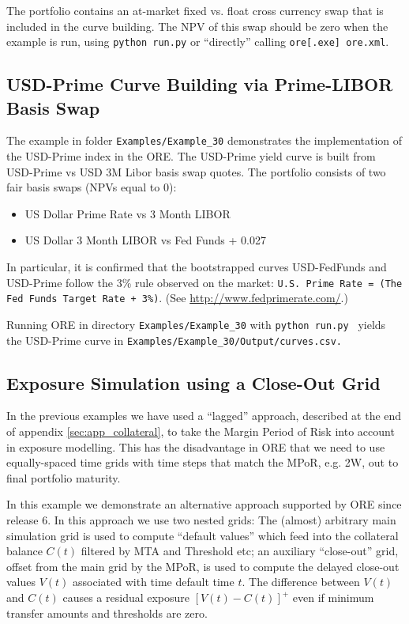 \documentclass[12pt, a4paper]{article}
\begin{document}
The portfolio contains an at-market fixed vs. float cross currency swap that is 
included in the curve building. The NPV of this swap should be zero when the example is run,
using {\tt python run.py} or ``directly'' calling {\tt ore[.exe] ore.xml}.

\subsection{USD-Prime Curve Building via Prime-LIBOR Basis Swap}%
\label{example:30}

The example in folder {\tt Examples/Example\_30} demonstrates the implementation of the USD-Prime index in the ORE.
The USD-Prime yield curve is built from USD-Prime vs USD 3M Libor basis swap quotes.
The portfolio consists of two fair basis swaps (NPVs equal to 0):
\begin{itemize}
\item US Dollar Prime Rate vs 3 Month LIBOR
\item US Dollar 3 Month LIBOR vs Fed Funds + 0.027
\end{itemize}

In particular, it is confirmed that the bootstrapped curves USD-FedFunds and USD-Prime follow
the 3\% rule observed on the market: {\tt U.S. Prime Rate = (The Fed Funds Target Rate + 3\%)}.
(See \url{http://www.fedprimerate.com/}.)

Running ORE in directory {\tt Examples/Example\_30} with {\tt python run.py }
yields the USD-Prime curve in {\tt Examples/Example\_30/Output/curves.csv.}

\subsection{Exposure Simulation using a Close-Out Grid}%
\label{example:31}

In the previous examples we have used a ``lagged'' approach, described at the end of appendix \ref{sec:app_collateral}, to take the Margin Period of Risk into account in exposure modelling. This has the disadvantage in ORE that we need to use equally-spaced time grids with time steps that match the MPoR, e.g. 2W, out to final portfolio maturity. 

In this example we demonstrate an alternative approach supported by ORE since release 6. In this approach we use two nested grids: The (almost) arbitrary main simulation grid is used to compute ``default values'' which feed into the collateral balance $C(t)$ filtered by MTA and Threshold etc; an auxiliary ``close-out'' grid, offset from the main grid by the MPoR, is used to compute the delayed close-out values $V(t)$ associated with time default time $t$. The difference between $V(t)$ and $C(t)$ causes a residual exposure $[V(t)-C(t)]^+$ even if minimum transfer amounts and thresholds are zero.
\end{document}
